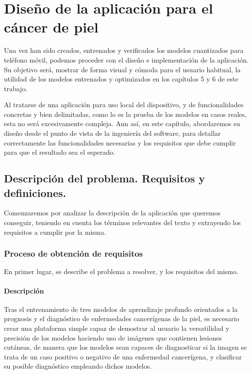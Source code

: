 \chapter{Diseño de la aplicación para el cáncer de piel}

Una vez han sido creados, entrenados y verificados los modelos cuantizados para teléfono móvil, podemos proceder con el diseño e implementación de la aplicación. Su objetivo será, mostrar de forma visual y cómoda para el usuario habitual, la utilidad de los modelos entrenados y optimizados en los capítulos 5 y 6 de este trabajo.

Al tratarse de una aplicación para uso local del dispositivo, y de funcionalidades concretas y bien delimitadas, como lo es la prueba de los modelos en casos reales, esta no será excesivamente compleja. Aun así, en este capítulo, abordaremos su diseño desde el punto de vista de la ingeniería del software, para detallar correctamente las funcionalidades necesarias y los requisitos que debe cumplir para que el resultado sea el esperado.

\section{Descripción del problema. Requisitos y definiciones.}
\label{sec:descripcion}

Comenzaremos por analizar la descripción de la aplicación que queremos conseguir, teniendo en cuenta los términos relevantes del texto y extrayendo los requisitos a cumplir por la misma.

\subsection{Proceso de obtención de requisitos}

En  primer lugar, se describe el problema a resolver, y los requisitos del mismo.

\subsubsection{Descripción}
Tras el entrenamiento de tres modelos de aprendizaje profundo orientados a la prognosis y el diagnóstico de enfermedades cancerígenas de la piel, es necesario crear una plataforma simple capaz de demostrar al usuario la versatilidad y precisión de los modelos haciendo uso de imágenes que contienen lesiones cutáneas, de manera que los modelos sean capaces de diagnosticar si la imagen se trata de un caso positivo o negativo de una enfermedad cancerígena, y clasificar su posible diagnóstico empleando dichos modelos.

